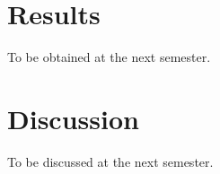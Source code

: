 \section{Results}
To be obtained at the next semester.



\section{Discussion}
To be discussed at the next semester.




